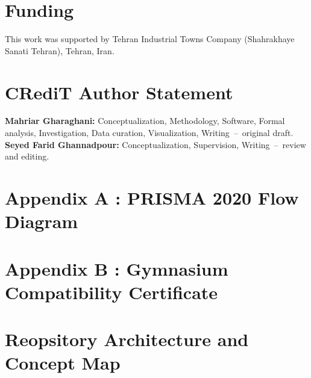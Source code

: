 \documentclass[11pt,a4paper]{article}
\theoremstyle{definition}
\theoremstyle{remark}
\begin{document}
\FloatBarrier


\section*{Funding}

This work was supported by Tehran Industrial Towns Company
(Shahrakhaye Sanati Tehran), Tehran, Iran.

\FloatBarrier


\section*{CRediT Author Statement}

\textbf{Mahriar Gharaghani:} Conceptualization, Methodology, Software,
Formal analysis, Investigation, Data curation, Visualization,
Writing~--~original draft.
\textbf{Seyed Farid Ghannadpour:} Conceptualization, Supervision,
Writing~--~review and editing.

\FloatBarrier




\clearpage
\appendix
\section{Appendix A : PRISMA 2020 Flow Diagram}
\label{app:prisma}

\FloatBarrier


\section{Appendix B : Gymnasium Compatibility Certificate}
\label{app:gym_certificate}

\FloatBarrier

\section{Reopsitory Architecture and Concept Map}
\label{app:repo_map}

\end{document}
